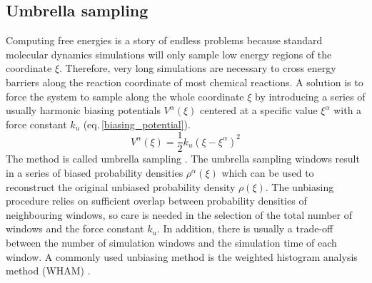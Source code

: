 \subsection{Umbrella sampling}
Computing free energies is a story of endless problems because standard molecular dynamics simulations will only sample low energy regions of the coordinate $\xi$. Therefore, very long simulations are necessary to cross energy barriers along the reaction coordinate of most chemical reactions. A solution is to force the system to sample along the whole coordinate $\xi$ by introducing a series of usually harmonic biasing potentials $V^{\alpha}(\xi)$ centered at a specific value $\xi^{\alpha}$ with a force constant $k_u$ (eq.\,\ref{biasing_potential}). 
\begin{equation} \label{biasing_potential}
    V^{\alpha}(\xi) = \frac{1}{2} k_u (\xi - \xi^{\alpha})^2
\end{equation}
The method is called umbrella sampling \cite{Torrie1977}. The umbrella sampling windows result in a series of biased probability densities $\rho^{\alpha}(\xi)$ which can be used to reconstruct the original unbiased probability density $\rho(\xi)$. The unbiasing procedure relies on sufficient overlap between probability densities of neighbouring windows, so care is needed in the selection of the total number of windows and the force constant $k_u$. In addition, there is usually a trade-off between the number of simulation windows and the simulation time of each window. A commonly used unbiasing method is the weighted histogram analysis method (WHAM) \cite{Kumar1992}. 